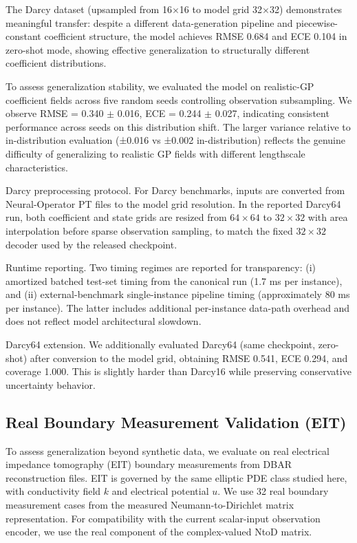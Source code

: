 \documentclass{article}
\begin{document}
The Darcy dataset (upsampled from 16$\times$16 to model grid 32$\times$32) demonstrates meaningful transfer: despite a different data-generation pipeline and piecewise-constant coefficient structure, the model achieves RMSE 0.684 and ECE 0.104 in zero-shot mode, showing effective generalization to structurally different coefficient distributions.

To assess generalization stability, we evaluated the model on realistic-GP coefficient fields across five random seeds controlling observation subsampling. We observe RMSE = 0.340 $\pm$ 0.016, ECE = 0.244 $\pm$ 0.027, indicating consistent performance across seeds on this distribution shift. The larger variance relative to in-distribution evaluation (±0.016 vs ±0.002 in-distribution) reflects the genuine difficulty of generalizing to realistic GP fields with different lengthscale characteristics.

Darcy preprocessing protocol. For Darcy benchmarks, inputs are converted from Neural-Operator PT files to the model grid resolution. In the reported Darcy64 run, both coefficient and state grids are resized from $64 \times 64$ to $32 \times 32$ with area interpolation before sparse observation sampling, to match the fixed $32 \times 32$ decoder used by the released checkpoint.

Runtime reporting. Two timing regimes are reported for transparency: (i) amortized batched test-set timing from the canonical run (1.7 ms per instance), and (ii) external-benchmark single-instance pipeline timing (approximately 80 ms per instance). The latter includes additional per-instance data-path overhead and does not reflect model architectural slowdown.

Darcy64 extension. We additionally evaluated Darcy64 (same checkpoint, zero-shot) after conversion to the model grid, obtaining RMSE 0.541, ECE 0.294, and coverage 1.000. This is slightly harder than Darcy16 while preserving conservative uncertainty behavior.

\subsection{Real Boundary Measurement Validation (EIT)}
To assess generalization beyond synthetic data, we evaluate on real electrical impedance tomography (EIT) boundary measurements from DBAR reconstruction files. EIT is governed by the same elliptic PDE class studied here, with conductivity field $k$ and electrical potential $u$. We use 32 real boundary measurement cases from the measured Neumann-to-Dirichlet matrix representation. For compatibility with the current scalar-input observation encoder, we use the real component of the complex-valued NtoD matrix.
\end{document}

